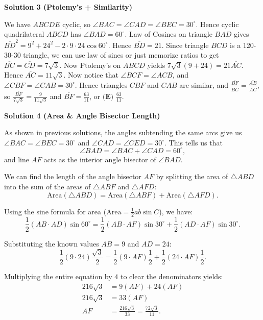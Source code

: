 \begin{enumerate}
 



\textbf{Solution 3 (Ptolemy’s + Similarity)}

We have $ABCDE$ cyclic, so $\angle BAC=\angle CAD=\angle BEC=30^\circ$. Hence cyclic quadrilateral $ABCD$ has $\angle BAD=60^\circ$. Law of Cosines on triangle $BAD$ gives $\overline{BD}^2=9^2+24^2-2\cdot9\cdot24\cos60^\circ$. Hence $\overline{BD}=21$. Since triangle $BCD$ is a 120-30-30 triangle, we can use law of sines or just memorize ratios to get $\overline{BC}=\overline{CD}=7\sqrt3$. Now Ptolemy’s on $ABCD$ yields $7\sqrt3(9+24)=21\overline{AC}$. Hence $\overline{AC}=11\sqrt3$. Now notice that $\angle BCF=\angle ACB$, and $\angle CBF=\angle CAB=30^\circ$. Hence triangles $CBF$ and $CAB$ are similar, and $\frac{\overline{BF}}{\overline{BC}}=\frac{\overline{AB}}{\overline{AC}}$, so $\frac{\overline{BF}}{7\sqrt3}=\frac9{11\sqrt3}$ and $\overline{BF}=\frac{63}{11}$, or $\boxed{\textbf{(E) } \frac{63}{11}}$.

 



\textbf{Solution 4 (Area & Angle Bisector Length)}

As shown in previous solutions, the angles subtending the same arcs give us $\angle BAC = \angle BEC = 30^\circ$ and $\angle CAD = \angle CED = 30^\circ.$ This tells us that 
 \[\angle BAD = \angle BAC + \angle CAD = 60^\circ,\]and line $AF$ acts as the interior angle bisector of $\angle BAD.$

 We can find the length of the angle bisector $AF$ by splitting the area of $\triangle ABD$ into the sum of the areas of $\triangle ABF$ and $\triangle AFD$:
 \[\text{Area}(\triangle ABD) = \text{Area}(\triangle ABF) + \text{Area}(\triangle AFD).\]

 Using the sine formula for area ($\text{Area} = \frac{1}{2}ab\sin C$), we have:
 \[\frac{1}{2}(AB \cdot AD) \sin 60^\circ = \frac{1}{2}(AB \cdot AF) \sin 30^\circ + \frac{1}{2}(AD \cdot AF) \sin 30^\circ.\]

 Substituting the known values $AB = 9$ and $AD = 24$:
 \[\frac{1}{2}(9 \cdot 24) \frac{\sqrt{3}}{2} = \frac{1}{2}(9 \cdot AF) \frac{1}{2} + \frac{1}{2}(24 \cdot AF) \frac{1}{2}.\]

 Multiplying the entire equation by $4$ to clear the denominators yields:
 \begin{align*} 216\sqrt{3} &= 9(AF) + 24(AF) \\ 216\sqrt{3} &= 33(AF) \\ AF &= \frac{216\sqrt{3}}{33} = \frac{72\sqrt{3}}{11}. \end{align*}



\end{enumerate}
